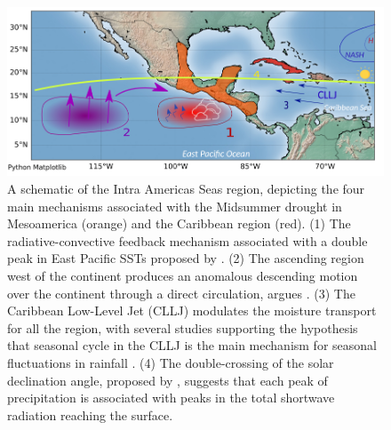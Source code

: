 \begin{figure}[t!]
\includegraphics[width=\linewidth]{figures/back_msd_diag.png}
\caption[Mechanisms of the Midsummer drought]{A schematic of the Intra Americas Seas region, depicting the four main mechanisms associated with the Midsummer drought in Mesoamerica (orange) and the Caribbean region (red). (1) The radiative-convective feedback mechanism associated with a double peak in East Pacific SSTs proposed by \cite{magana1999}. (2) The ascending region west of the continent produces an anomalous descending motion over the continent through a direct circulation, argues \cite{herrera2015}. (3) The Caribbean Low-Level Jet (CLLJ) modulates the moisture transport for all the region, with several studies supporting the hypothesis that seasonal cycle in the CLLJ is the main mechanism for seasonal fluctuations in rainfall \citep{duranquesada2017,martinez2019}. (4) The double-crossing of the solar declination angle, proposed by \cite{karnauskas2013}, suggests that each peak of precipitation is associated with peaks in the total shortwave radiation reaching the surface.   }
\label{fig:msd_schematic}
\end{figure}

